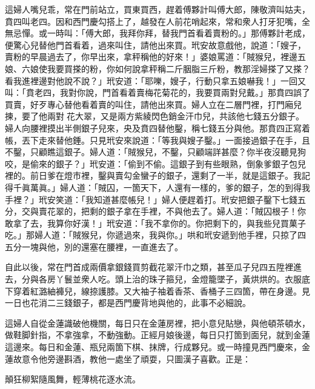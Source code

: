 這婦人嘴兒乖，常在門前站立，買東買西，趕着傅夥計叫傅大郎，陳敬濟叫姑夫，賁四叫老四。因和西門慶勾搭上了，越發在人前花哨起來，常和衆人打牙犯嘴，全無忌憚。或一時叫：「傅大郎，我拜你拜，替我門首看着賣粉的。」{}那傅夥計老成，便驚心兒替他門首看着，過來叫住，請他出來買。玳安故意戲他，說道：「嫂子，賣粉的早晨過去了，你早出來，拿秤稱他的好來！」婆娘罵道：「賊猴兒，裡邊五娘、六娘使我要買搽的粉，你如何說拿秤稱二斤胭脂三斤粉，教那淫婦搽了又搽？看我進裡邊對他說不說？」玳安道：「耶嚛，嫂子，行動只拿五娘嚇我！」一回又叫：「賁老四，我對你說，門首看着賣梅花菊花的，我要買兩對兒戴。」{}那賁四誤了買賣，好歹專心替他看着賣的叫住，請他出來買。婦人立在二層門裡，打門廂兒揀，要了他兩對𩬆花大翠，又是兩方紫綾閃色銷金汗巾兒，共該他七錢五分銀子。婦人向腰裡摸出半側銀子兒來，央及賁四替他鑿，稱七錢五分與他。那賁四正寫着帳，丟下走來替他錘。只見玳安來說道：「等我與嫂子鑿。」一面接過銀子在手，且不鑿，只顧瞧這銀子。{}婦人道：「賊猴兒，不鑿，只顧端詳甚麼？你半夜沒聽見狗咬，是偷來的銀子？」玳安道：「偷到不偷。這銀子到有些眼熟，倒象爹銀子包兒裡的。前日爹在燈市裡，鑿與賣勾金蠻子的銀子，還剩了一半，就是這銀子。我記得千眞萬眞。」婦人道：「賊囚，一箇天下，人還有一樣的，爹的銀子，怎的到得我手裡？」{}玳安笑道：「我知道甚麼帳兒！」婦人便趕着打。玳安把銀子鑿下七錢五分，交與賣花翠的，把剩的銀子拿在手裡，不與他去了。婦人道：「賊囚根子！你敢拿了去，我算你好漢！」玳安道：「我不拿你的。你把剩下的，與我些兒買菓子吃。」那婦人道：「賊猴兒，你遞過來，我與你。」哄和玳安遞到他手裡，只掠了四五分一塊與他，別的還塞在腰裡，一直進去了。

自此以後，常在門首成兩價拿銀錢買剪截花翠汗巾之類，甚至瓜子兒四五陞裡進去，分與各房丫鬟並衆人吃。頭上治的珠子箍兒，金燈籠墜子，黃烘烘的。衣服底下穿着紅潞紬褲兒，線捺護膝。又大袖子袖着香茶、香桶子三四箇，帶在身邊。見一日也花消二三錢銀子，都是西門慶背地與他的，此事不必細說。

這婦人自從金蓮識破他機關，每日只在金蓮房裡，把小意兒貼戀，與他頓茶頓水，做鞋脚針指，不拿強拿，不動強動。正經月娘後邊，每日只打箇到面兒，就到金蓮這邊來。每日和金蓮、瓶兒兩箇下棋、抹牌，行成夥兒。或一時撞見西門慶來，金蓮故意令他旁邊斟酒，教他一處坐了頑耍，只圖漢子喜歡。正是：

\begin{myquote} 
顛狂柳絮隨風舞，輕薄桃花逐水流。
\end{myquote} 

